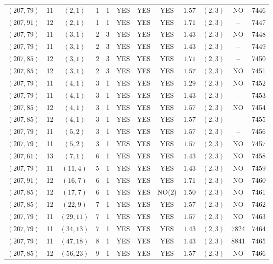 \begin{longtable}{|c|c|c|c|c|c|c|c|c|c|c|c|}
$(207,79)$ & 11 & $(2,1)$ & 1 & 1 & YES & YES & YES & $1.57$ & $(2,3)$ & NO & 7446\\
$(207,91)$ & 12 & $(2,1)$ & 1 & 1 & YES & YES & YES & $1.71$ & $(2,3)$ & -- & 7447\\
$(207,79)$ & 11 & $(3,1)$ & 2 & 3 & YES & YES & YES & $1.43$ & $(2,3)$ & NO & 7448\\
$(207,79)$ & 11 & $(3,1)$ & 2 & 3 & YES & YES & YES & $1.43$ & $(2,3)$ & -- & 7449\\
$(207,85)$ & 12 & $(3,1)$ & 2 & 3 & YES & YES & YES & $1.71$ & $(2,3)$ & -- & 7450\\
$(207,85)$ & 12 & $(3,1)$ & 2 & 3 & YES & YES & YES & $1.57$ & $(2,3)$ & NO & 7451\\
$(207,79)$ & 11 & $(4,1)$ & 3 & 1 & YES & YES & YES & $1.29$ & $(2,3)$ & NO & 7452\\
$(207,79)$ & 11 & $(4,1)$ & 3 & 1 & YES & YES & YES & $1.43$ & $(2,3)$ & -- & 7453\\
$(207,85)$ & 12 & $(4,1)$ & 3 & 1 & YES & YES & YES & $1.57$ & $(2,3)$ & NO & 7454\\
$(207,85)$ & 12 & $(4,1)$ & 3 & 1 & YES & YES & YES & $1.57$ & $(2,3)$ & -- & 7455\\
$(207,79)$ & 11 & $(5,2)$ & 3 & 1 & YES & YES & YES & $1.57$ & $(2,3)$ & -- & 7456\\
$(207,79)$ & 11 & $(5,2)$ & 3 & 1 & YES & YES & YES & $1.57$ & $(2,3)$ & NO & 7457\\
$(207,61)$ & 13 & $(7,1)$ & 6 & 1 & YES & YES & YES & $1.43$ & $(2,3)$ & NO & 7458\\
$(207,79)$ & 11 & $(11,4)$ & 5 & 1 & YES & YES & YES & $1.43$ & $(2,3)$ & NO & 7459\\
$(207,91)$ & 12 & $(16,7)$ & 6 & 1 & YES & YES & YES & $1.71$ & $(2,3)$ & NO & 7460\\
$(207,85)$ & 12 & $(17,7)$ & 6 & 1 & YES & YES & NO(2) & $1.50$ & $(2,3)$ & NO & 7461\\
$(207,85)$ & 12 & $(22,9)$ & 7 & 1 & YES & YES & YES & $1.57$ & $(2,3)$ & NO & 7462\\
$(207,79)$ & 11 & $(29,11)$ & 7 & 1 & YES & YES & YES & $1.57$ & $(2,3)$ & NO & 7463\\
$(207,79)$ & 11 & $(34,13)$ & 7 & 1 & YES & YES & YES & $1.43$ & $(2,3)$ & 7824 & 7464\\
$(207,79)$ & 11 & $(47,18)$ & 8 & 1 & YES & YES & YES & $1.43$ & $(2,3)$ & 8841 & 7465\\
$(207,85)$ & 12 & $(56,23)$ & 9 & 1 & YES & YES & YES & $1.57$ & $(2,3)$ & NO & 7466\\

\end{longtable}

